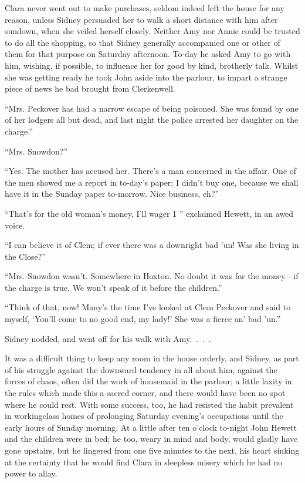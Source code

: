 Clara never went out to make purchases, seldom indeed left the house for
any reason, unless Sidney persuaded her to walk a short distance with
him after sundown, when she veiled herself closely. Neither Amy nor
Annie could be trusted to do all the shopping, so that Sidney generally
accompanied one or other of them for that purpose on Saturday afternoon.
To-day he asked Amy to go with him, wishing, if possible, to influence
her for good by kind, {\protect\hypertarget{271}{}{}}brotherly talk.
Whilst she was getting ready he took John aside into the parlour, to
impart a strange piece of news he bad brought from Clerkenwell.

``Mrs. Peckover has had a narrow escape of being poisoned. She was found
by one of her lodgers all but dead, and last night the police arrested
her daughter on the charge.''

``Mrs. Snowdon?''

``Yes. The mother has accused her. There's a man concerned in the
affair. One of the men showed me a report in to-day's paper; I didn't
buy one, because we shall have it in the Sunday paper to-morrow. Nice
business, eh?''

``That's for the old woman's money, I'll wager 1 '' exclaimed Hewett, in
an awed voice.

``I can believe it of Clem; if ever there was a downright bad 'un! Was
she living in the Close?''

``Mrs. Snowdon wasn't. Somewhere in Hoxton. No doubt it was for the
money---if the charge is true. We won't speak of it before the
children.''

``Think of that, now! Many's the time I've looked at Clem Peckover and
said to myself, {\protect\hypertarget{272}{}{}}`You'll come to no good
end, my lady!' She was a fierce an' bad 'un.''

Sidney nodded, and went off for his walk with Amy{.~.~.~.}

It was a difficult thing to keep any room in the house orderly, and
Sidney, as part of his struggle against the downward tendency in all
about him, against the forces of chaos, often did the work of housemaid
in the parlour; a little laxity in the rules which made this a sacred
corner, and there would have been no spot where he could rest. With some
success, too, he had resisted the habit prevalent in workingclass homes
of prolonging Saturday evening's occupations until the early hours of
Sunday morning. At a little after ten o'clock to-night John Hewett and
the children were in bed; he too, weary in mind and body, would gladly
have gone upstairs, but he lingered from one five minutes to the next,
his heart sinking at the certainty that he would find Clara in sleepless
misery which he had no power to allay.


